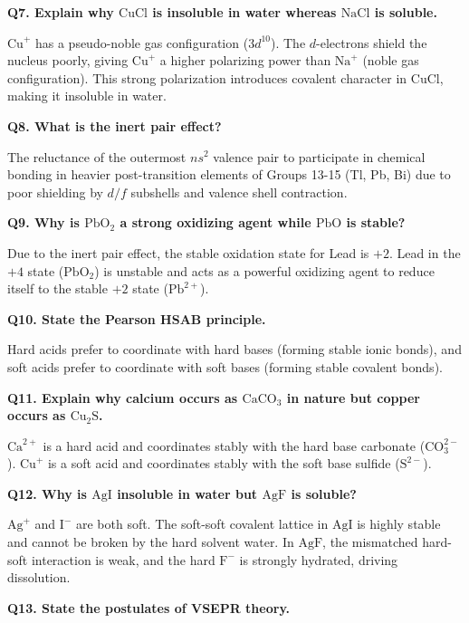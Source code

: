 \documentclass[12pt,a4paper]{article}
\newcommand{\Q}[1]{\textbf{#1}\par\noindent\ignorespaces}
\begin{document}
\begin{tcolorbox}[exambox, title={Frequently Asked / Viva Questions}]
  \par\vspace{6pt}
  \Q{Q7. Explain why $\text{CuCl}$ is insoluble in water whereas $\text{NaCl}$ is soluble.}
  $\text{Cu}^+$ has a pseudo-noble gas configuration ($3d^{10}$). The $d$-electrons shield the nucleus poorly, giving $\text{Cu}^+$ a higher polarizing power than $\text{Na}^+$ (noble gas configuration). This strong polarization introduces covalent character in $\text{CuCl}$, making it insoluble in water.
  \par\vspace{6pt}
  \Q{Q8. What is the inert pair effect?}
  The reluctance of the outermost $ns^2$ valence pair to participate in chemical bonding in heavier post-transition elements of Groups 13-15 (Tl, Pb, Bi) due to poor shielding by $d/f$ subshells and valence shell contraction.
  \par\vspace{6pt}
  \Q{Q9. Why is $\text{PbO}_2$ a strong oxidizing agent while $\text{PbO}$ is stable?}
  Due to the inert pair effect, the stable oxidation state for Lead is $+2$. Lead in the $+4$ state ($\text{PbO}_2$) is unstable and acts as a powerful oxidizing agent to reduce itself to the stable $+2$ state ($\text{Pb}^{2+}$).
  \par\vspace{6pt}
  \Q{Q10. State the Pearson HSAB principle.}
  Hard acids prefer to coordinate with hard bases (forming stable ionic bonds), and soft acids prefer to coordinate with soft bases (forming stable covalent bonds).
  \par\vspace{6pt}
  \Q{Q11. Explain why calcium occurs as $\text{CaCO}_3$ in nature but copper occurs as $\text{Cu}_2\text{S}$.}
  $\text{Ca}^{2+}$ is a hard acid and coordinates stably with the hard base carbonate ($\text{CO}_3^{2-}$). $\text{Cu}^+$ is a soft acid and coordinates stably with the soft base sulfide ($\text{S}^{2-}$).
  \par\vspace{6pt}
  \Q{Q12. Why is $\text{AgI}$ insoluble in water but $\text{AgF}$ is soluble?}
  $\text{Ag}^+$ and $\text{I}^-$ are both soft. The soft-soft covalent lattice in $\text{AgI}$ is highly stable and cannot be broken by the hard solvent water. In $\text{AgF}$, the mismatched hard-soft interaction is weak, and the hard $\text{F}^-$ is strongly hydrated, driving dissolution.
  \par\vspace{6pt}
  \Q{Q13. State the postulates of VSEPR theory.}

\end{tcolorbox}
\end{document}
